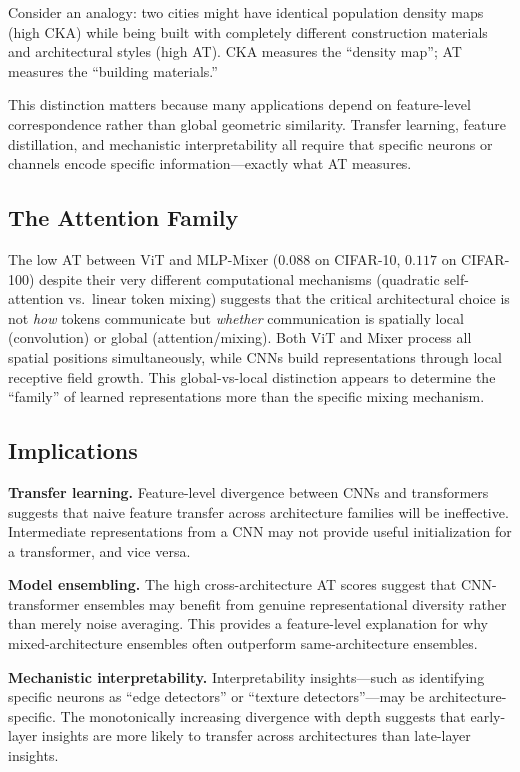 \documentclass{article}
\begin{document}
Consider an analogy: two cities might have identical population density maps (high CKA) while being built with completely different construction materials and architectural styles (high AT). CKA measures the ``density map''; AT measures the ``building materials.''

This distinction matters because many applications depend on feature-level correspondence rather than global geometric similarity. Transfer learning, feature distillation, and mechanistic interpretability all require that specific neurons or channels encode specific information---exactly what AT measures.

\subsection{The Attention Family}

The low AT between ViT and MLP-Mixer ($0.088$ on CIFAR-10, $0.117$ on CIFAR-100) despite their very different computational mechanisms (quadratic self-attention vs.\ linear token mixing) suggests that the critical architectural choice is not \emph{how} tokens communicate but \emph{whether} communication is spatially local (convolution) or global (attention/mixing). Both ViT and Mixer process all spatial positions simultaneously, while CNNs build representations through local receptive field growth. This global-vs-local distinction appears to determine the ``family'' of learned representations more than the specific mixing mechanism.

\subsection{Implications}

\textbf{Transfer learning.} Feature-level divergence between CNNs and transformers suggests that naive feature transfer across architecture families will be ineffective. Intermediate representations from a CNN may not provide useful initialization for a transformer, and vice versa.

\textbf{Model ensembling.} The high cross-architecture AT scores suggest that CNN-transformer ensembles may benefit from genuine representational diversity rather than merely noise averaging. This provides a feature-level explanation for why mixed-architecture ensembles often outperform same-architecture ensembles.

\textbf{Mechanistic interpretability.} Interpretability insights---such as identifying specific neurons as ``edge detectors'' or ``texture detectors''---may be architecture-specific. The monotonically increasing divergence with depth suggests that early-layer insights are more likely to transfer across architectures than late-layer insights.
\end{document}
